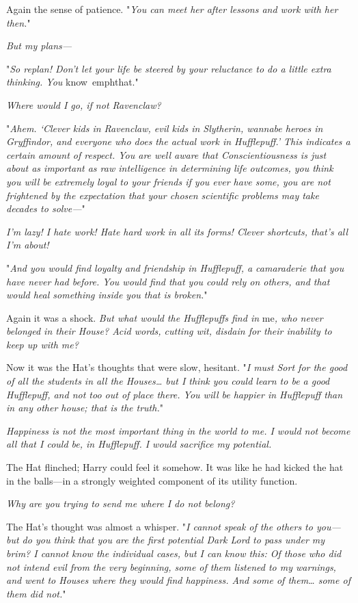 Again the sense of patience. "\emph{You can meet her after lessons and work 
with her then.}"

\emph{But my plans---}

"\emph{So replan! Don't let your life be steered by your reluctance to do a 
little extra thinking. You} know\ emph{that.}"

\emph{Where would I go, if not Ravenclaw?}

"\emph{Ahem. `Clever kids in Ravenclaw, evil kids in Slytherin, wannabe heroes 
in Gryffindor, and everyone who does the actual work in Hufflepuff.' This 
indicates a certain amount of respect. You are well aware that 
Conscientiousness is just about as important as raw intelligence in determining 
life outcomes, you think you will be extremely loyal to your friends if you 
ever have some, you are not frightened by the expectation that your chosen 
scientific problems may take decades to solve---}"

\emph{I'm lazy! I hate work! Hate hard work in all its forms! Clever shortcuts, 
that's all I'm about!}

"\emph{And you would find loyalty and friendship in Hufflepuff, a camaraderie 
that you have never had before. You would find that you could rely on others, 
and that would heal something inside you that is broken.}"

Again it was a shock. \emph{But what would the Hufflepuffs find in} me\emph{, 
who never belonged in their House? Acid words, cutting wit, disdain for their 
inability to keep up with me?}

Now it was the Hat's thoughts that were slow, hesitant. "\emph{I must Sort for 
the good of all the students in all the Houses{\ldots} but I think you could 
learn to be a good Hufflepuff, and not too out of place there. You will be 
happier in Hufflepuff than in any other house; that is the truth.}"

\emph{Happiness is not the most important thing in the world to me. I would not 
become all that I could be, in Hufflepuff. I would sacrifice my potential.}

The Hat flinched; Harry could feel it somehow. It was like he had kicked the 
hat in the balls---in a strongly weighted component of its utility function.

\emph{Why are you trying to send me where I do not belong?}

The Hat's thought was almost a whisper. "\emph{I cannot speak of the others to 
you---but do you think that you are the first potential Dark Lord to pass under 
my brim? I cannot know the individual cases, but I can know this: Of those who 
did not intend evil from the very beginning, some of them listened to my 
warnings, and went to Houses where they would find happiness. And some of 
them{\ldots} some of them did not.}"

